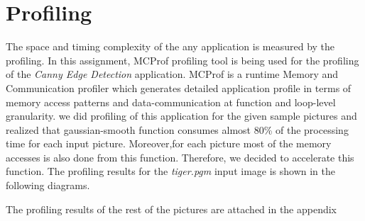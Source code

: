 \section{Profiling}
\label{sec:profiling}
The space and timing complexity of the any application is measured by the profiling. In this assignment, MCProf profiling tool is being used for the profiling of the  \emph{Canny Edge Detection} application. MCProf is a  runtime Memory and Communication profiler which generates detailed application profile in terms of memory access patterns and data-communication at function and loop-level granularity. we did  profiling  of this application for the given sample pictures and realized that gaussian-smooth function consumes almost 80\% of the processing time for each input picture. Moreover,for each picture most of the memory accesses is also done from this function. Therefore, we decided to accelerate this function. The profiling results for the \emph{tiger.pgm} input image is shown in the  following diagrams. 

The profiling results of the rest of the pictures are attached in the appendix